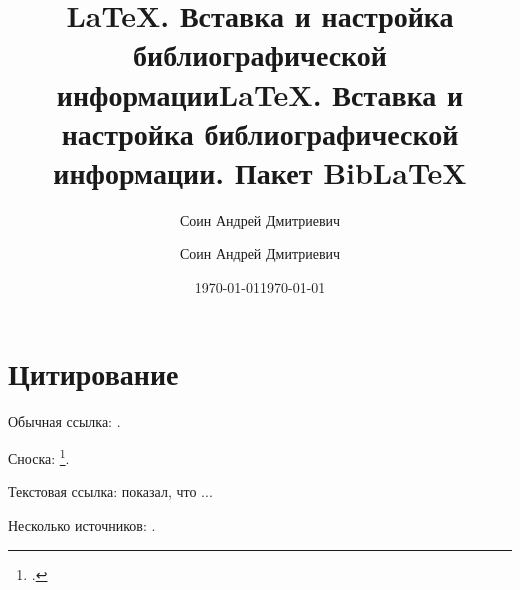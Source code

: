 \documentclass[a4paper,12pt]{article}
\author{Соин Андрей Дмитриевич}
\title{\LaTeX. Вставка и настройка библиографической информации}
\date{\today}
\author{Соин Андрей Дмитриевич}
\title{\LaTeX. Вставка и настройка библиографической информации. Пакет Bib\LaTeX}
\date{\today}
\begin{document}
\maketitle

\tableofcontents

\section{Цитирование}

Обычная ссылка: \cite{львовский2022набор}.

Сноска: \footcite{ким2003теория}.

Текстовая ссылка: \textcite{дорф2004современные} показал, что ...

Несколько источников: \cite{ким2003теория,дорф2004современные,львовский2022набор}.

\nocite{ljung2010perspectives}
\nocite{ljung1977analysis}


\printbibliography[title={Список использованных источников}]
\end{document}
